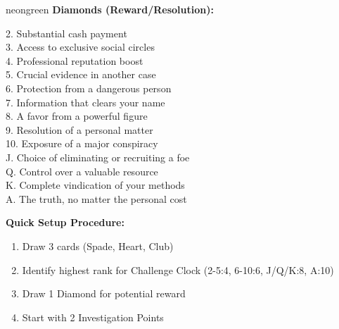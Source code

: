 \documentclass[11pt]{article}
\begin{document}
\begin{noirsection}{neongreen}
\textbf{Diamonds (Reward/Resolution):}
\begin{small}
\begin{multicols}{2}
2. Substantial cash payment\\
3. Access to exclusive social circles\\
4. Professional reputation boost\\
5. Crucial evidence in another case\\
6. Protection from a dangerous person\\
7. Information that clears your name\\
8. A favor from a powerful figure\\
9. Resolution of a personal matter\\
10. Exposure of a major conspiracy\\
J. Choice of eliminating or recruiting a foe\\
Q. Control over a valuable resource\\
K. Complete vindication of your methods\\
A. The truth, no matter the personal cost
\end{multicols}
\end{small}

\textbf{Quick Setup Procedure:}
\begin{enumerate}
    \item Draw 3 cards (Spade, Heart, Club)
    \item Identify highest rank for Challenge Clock (2-5:4, 6-10:6, J/Q/K:8, A:10)
    \item Draw 1 Diamond for potential reward
    \item Start with 2 Investigation Points
\end{enumerate}
\end{noirsection}

\newpage
\end{document}
